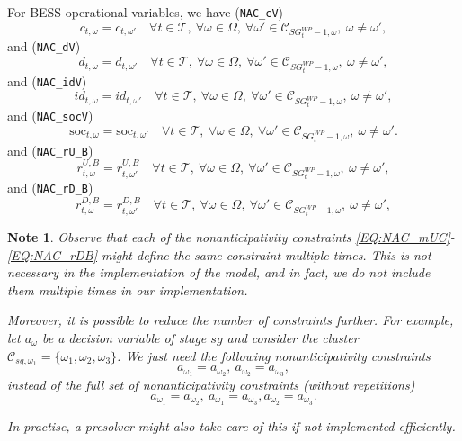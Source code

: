 \documentclass{article}
\newcommand{\soc}{\text{soc}}
\newtheorem{note}{Note}[section]
\begin{document}
For BESS operational variables, we have (\verb|NAC_cV|)
\begin{equation} \label{EQ:NAC_cV}
	c_{t, \omega} = c_{t, \omega'} \quad \forall t \in \mathcal{T}, \ \forall \omega \in \Omega, \ \forall \omega' \in \mathcal{C}_{SG^{WP}_t - 1, \omega}, \ \omega \neq \omega',
\end{equation}
and (\verb|NAC_dV|)
\begin{equation} \label{EQ:NAC_dV}
	d_{t, \omega} = d_{t, \omega'} \quad \forall t \in \mathcal{T}, \ \forall \omega \in \Omega, \ \forall \omega' \in \mathcal{C}_{SG^{WP}_t - 1, \omega}, \ \omega \neq \omega',
\end{equation}
and (\verb|NAC_idV|)
\begin{equation} \label{EQ:NAC_idV}
	id_{t, \omega} = id_{t, \omega'} \quad \forall t \in \mathcal{T}, \ \forall \omega \in \Omega, \ \forall \omega' \in \mathcal{C}_{SG^{WP}_t - 1, \omega}, \ \omega \neq \omega',
\end{equation}
and (\verb|NAC_socV|)
\begin{equation} \label{EQ:NAC_socV}
	\soc_{t, \omega} = \soc_{t, \omega'} \quad \forall t \in \mathcal{T}, \ \forall \omega \in \Omega, \ \forall \omega' \in \mathcal{C}_{SG^{WP}_t - 1, \omega}, \ \omega \neq \omega'.
\end{equation}
and (\verb|NAC_rU_B|)
\begin{equation} \label{EQ:NAC_rUB}
	r^{U,B}_{t, \omega} = r^{U,B}_{t, \omega'} \quad \forall t \in \mathcal{T},\ \forall \omega \in \Omega,\ \forall \omega' \in \mathcal{C}_{SG^{WP}_t - 1, \omega},\ \omega \neq \omega',
\end{equation}
and (\verb|NAC_rD_B|)
\begin{equation} \label{EQ:NAC_rDB}
	r^{D,B}_{t, \omega} = r^{D,B}_{t, \omega'} \quad \forall t \in \mathcal{T},\ \forall \omega \in \Omega,\ \forall \omega' \in \mathcal{C}_{SG^{WP}_t - 1, \omega},\ \omega \neq \omega',
\end{equation}


\begin{note}
Observe that each of the nonanticipativity constraints \eqref{EQ:NAC_mUC}-\eqref{EQ:NAC_rDB} might define the same constraint multiple times. This is not necessary in the implementation of the model, and in fact, we do not include them multiple times in our implementation.
	
Moreover, it is possible to reduce the number of constraints further. For example, let $a_{\omega}$ be a decision variable of stage $sg$ and consider the cluster $\mathcal{C}_{sg, \omega_1} = \{ \omega_1, \omega_2, \omega_3 \}$. We just need the following nonanticipativity constraints 
$$
a_{\omega_1} = a_{\omega_2}, \ a_{\omega_2} = a_{\omega_3},
$$
instead of the full set of nonanticipativity constraints (without repetitions)
$$
a_{\omega_1} = a_{\omega_2}, \ a_{\omega_1} = a_{\omega_3}, a_{\omega_2} = a_{\omega_3}.
$$

In practise, a presolver might also take care of this if not implemented efficiently.	
\end{note}
\end{document}
